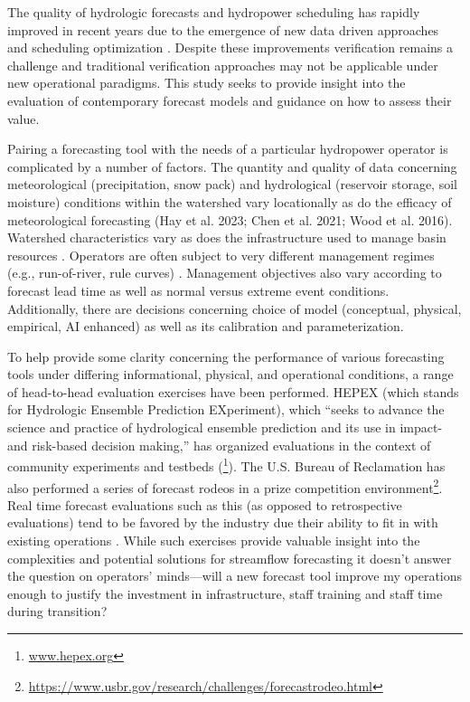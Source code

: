 \documentclass[MLA,Times1COL, hidelinks, doublespace]{WileyNJDv5} %
\begin{document}
The quality of hydrologic forecasts and hydropower scheduling has rapidly improved in recent years due to the emergence of new data driven approaches \citep{kratzertLearningUniversalRegional2019} and scheduling optimization \citep{zhangOptimizationShorttermHydropower2024}. Despite these improvements verification remains a challenge and traditional verification approaches may not be applicable under new operational paradigms. This study seeks to provide insight into the evaluation of contemporary forecast models and guidance on how to assess their value. 

Pairing a forecasting tool with the needs of a particular hydropower operator is complicated by a number of factors. The quantity and quality of data concerning meteorological (precipitation, snow pack) and hydrological (reservoir storage, soil moisture) conditions within the watershed vary locationally as do the efficacy of meteorological forecasting (Hay et al. 2023; Chen et al. 2021; Wood et al. 2016). Watershed characteristics vary as does the infrastructure used to manage basin resources \citep{phamEvaluationRandomForests2021}. Operators are often subject to very different management regimes (e.g., run-of-river, rule curves) \citep{zajacImpactLakeReservoir2017}. Management objectives also vary according to forecast lead time as well as normal versus extreme event conditions. Additionally, there are decisions concerning choice of model (conceptual, physical, empirical, AI enhanced) as well as its calibration and parameterization.  

To help provide some clarity concerning the performance of various forecasting tools under differing informational, physical, and operational conditions, a range of head-to-head evaluation exercises have been performed. HEPEX (which stands for Hydrologic Ensemble Prediction EXperiment), which “seeks to advance the science and practice of hydrological ensemble prediction and its use in impact- and risk-based decision making,” has organized evaluations in the context of community experiments and testbeds (\footnote{\url{www.hepex.org}}). The U.S. Bureau of Reclamation has also performed a series of forecast rodeos in a prize competition environment\footnote{\url{https://www.usbr.gov/research/challenges/forecastrodeo.html}}. Real time forecast evaluations such as this (as opposed to retrospective evaluations) tend to be favored by the industry due their ability to fit in with existing operations \citep{krajewskiRealtimeStreamflowForecasting2021}. While such exercises provide valuable insight into the complexities and potential solutions for streamflow forecasting it doesn’t answer the question on operators’ minds—will a new forecast tool improve my operations enough to justify the investment in infrastructure, staff training and staff time during transition? 
\end{document}
